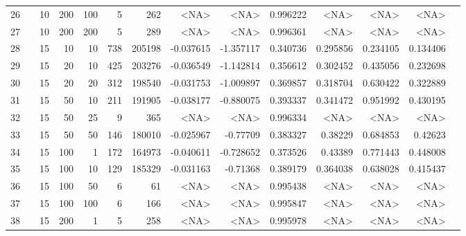 \begin{longtable}{llrrrrrrrrrrrr}
		26  & &           10 &               200 &          100 &              5 &        262 &      <NA> &      <NA> &  0.996222 &        <NA> &           <NA> &      <NA> \\
		27  & &           10 &               200 &          200 &              5 &        289 &      <NA> &      <NA> &  0.996361 &        <NA> &           <NA> &      <NA> \\
		28  & &           15 &                10 &           10 &         738 &     205198 & -0.037615 & -1.357117 &  0.340736 &    0.295856 &       0.234105 &  0.134406 \\
		29  & &           15 &                20 &           10 &         425 &     203276 & -0.036549 & -1.142814 &  0.356612 &    0.302452 &       0.435056 &  0.232698 \\
		30  & &           15 &                20 &           20 &         312 &     198540 & -0.031753 & -1.009897 &  0.369857 &    0.318704 &       0.630422 &  0.322889 \\
		31  & &           15 &                50 &           10 &         211 &     191905 & -0.038177 & -0.880075 &  0.393337 &    0.341472 &       0.951992 &  0.430195 \\
		32  & &           15 &                50 &           25 &              9 &        365 &      <NA> &      <NA> &  0.996334 &        <NA> &           <NA> &      <NA> \\
		33  & &           15 &                50 &           50 &         146 &     180010 & -0.025967 &  -0.77709 &  0.383327 &     0.38229 &       0.684853 &   0.42623 \\
		34  & &           15 &               100 &            1 &         172 &     164973 & -0.040611 & -0.728652 &  0.373526 &     0.43389 &       0.771443 &  0.448008 \\
		35  & &           15 &               100 &           10 &         129 &     185329 & -0.031163 &  -0.71368 &  0.389179 &    0.364038 &       0.638028 &  0.415437 \\
		36  & &           15 &               100 &           50 &              6 &         61 &      <NA> &      <NA> &  0.995438 &        <NA> &           <NA> &      <NA> \\
		37  & &           15 &               100 &          100 &              6 &        166 &      <NA> &      <NA> &  0.995847 &        <NA> &           <NA> &      <NA> \\
		38  & &           15 &               200 &            1 &              5 &        258 &      <NA> &      <NA> &  0.995978 &        <NA> &           <NA> &      <NA> \\

\end{longtable}
